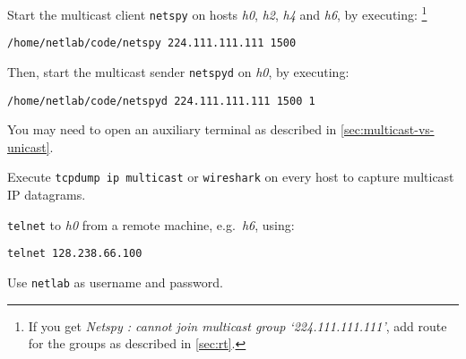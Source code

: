 \documentclass{../UTNetLab}
\begin{document}
    

    Start the multicast client \lstinline{netspy} on hosts \textit{h0}, \textit{h2}, \textit{h4} and \textit{h6}, by executing:%
    \footnote{If you get \textit{Netspy : cannot join multicast group `224.111.111.111'}, add route for the groups as described in \autoref{sec:rt}.}

    \begin{lstlisting}
/home/netlab/code/netspy 224.111.111.111 1500
    \end{lstlisting}
    
    Then, start the multicast sender \lstinline{netspyd} on \textit{h0}, by executing:

    \begin{lstlisting}
/home/netlab/code/netspyd 224.111.111.111 1500 1
    \end{lstlisting}
    You may need to open an auxiliary terminal as described in \autoref{sec:multicast-vs-unicast}.
    
    Execute \lstinline{tcpdump ip multicast} or \lstinline{wireshark} on every host to capture multicast IP datagrams.


    \lstinline{telnet} to \textit{h0} from a remote machine, e.g.\ \textit{h6}, using:

    \begin{lstlisting}
telnet 128.238.66.100
    \end{lstlisting}
    Use \texttt{netlab} as username and password.
\end{document}
